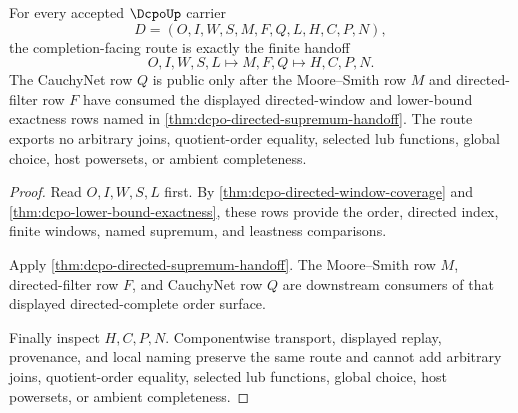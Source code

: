 \begin{theorem}
\label{thm:dcpo-completion-facing-handoff}
For every accepted $\DcpoUp$ carrier
$$
D=(O,I,W,S,M,F,Q,L,H,C,P,N),
$$
the completion-facing route is exactly the finite handoff
$$
O,I,W,S,L \longmapsto M,F,Q \longmapsto H,C,P,N .
$$
The CauchyNet row $Q$ is public only after the Moore--Smith row $M$ and directed-filter row $F$ have consumed the displayed directed-window and lower-bound exactness rows named in \autoref{thm:dcpo-directed-supremum-handoff}. The route exports no arbitrary joins, quotient-order equality, selected lub functions, global choice, host powersets, or ambient completeness.
\end{theorem}
\begin{proof}
Read $O,I,W,S,L$ first. By \autoref{thm:dcpo-directed-window-coverage} and \autoref{thm:dcpo-lower-bound-exactness}, these rows provide the order, directed index, finite windows, named supremum, and leastness comparisons.

Apply \autoref{thm:dcpo-directed-supremum-handoff}. The Moore--Smith row $M$, directed-filter row $F$, and CauchyNet row $Q$ are downstream consumers of that displayed directed-complete order surface.

Finally inspect $H,C,P,N$. Componentwise transport, displayed replay, provenance, and local naming preserve the same route and cannot add arbitrary joins, quotient-order equality, selected lub functions, global choice, host powersets, or ambient completeness.
\end{proof}

